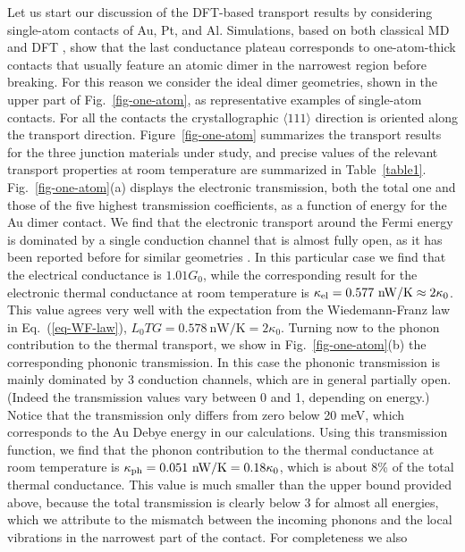 \documentclass[aps,amsmath,amssymb,twocolumn,showpacs]{revtex4-1}
\begin{document}
Let us start our discussion of the DFT-based transport results by considering
single-atom contacts of Au, Pt, and Al. Simulations, based on both classical
MD and DFT \cite{Jelinek2003,Dreher2005,Pauly2006}, show that the last
conductance plateau corresponds to one-atom-thick contacts that usually
feature an atomic dimer in the narrowest region before breaking. For this
reason we consider the ideal dimer geometries, shown in the upper part of
Fig.~\ref{fig-one-atom}, as representative examples of single-atom
contacts. For all the contacts the crystallographic $\langle 111 \rangle$
direction is oriented along the transport direction. Figure~\ref{fig-one-atom}
summarizes the transport results for the three junction materials under
study, and precise values of the relevant transport properties at room
temperature are summarized in Table~\ref{table1}. Fig.~\ref{fig-one-atom}(a)
displays the electronic transmission, both the total one and those of the five
highest transmission coefficients, as a function of energy for the Au dimer
contact. We find that the electronic transport around the Fermi energy is
dominated by a single conduction channel that is almost fully open, as it has
been reported before for similar geometries
\cite{Scheer1998,Cuevas1998a,Rubio-Bollinger2003,Pauly2008}. In this
particular case we find that the electrical conductance is $1.01G_0$, while
the corresponding result for the electronic thermal conductance at room
temperature is $\kappa_{\rm el} = 0.577~\text{nW/K}\approx 2\kappa_0$. This
value agrees very well with the expectation from the Wiedemann-Franz law in
Eq.~(\ref{eq-WF-law}), $L_0TG = 0.578~\text{nW/K}=2\kappa_0$. Turning now to
the phonon contribution to the thermal transport, we show in
Fig.~\ref{fig-one-atom}(b) the corresponding phononic transmission. In this
case the phononic transmission is mainly dominated by 3 conduction channels,
which are in general partially open. (Indeed the transmission values vary
between 0 and 1, depending on energy.) Notice that the transmission only
differs from zero below 20 meV, which corresponds to the Au Debye energy in
our calculations. Using this transmission function, we find that the phonon
contribution to the thermal conductance at room temperature is
$\kappa_{\rm ph} = 0.051~\text{nW/K} = 0.18\kappa_0$, which
is about 8\% of the total thermal conductance.
This value is much smaller than the upper bound provided above, because the
total transmission is clearly below 3 for almost all energies, which we
attribute to the mismatch between the incoming phonons and the local
vibrations in the narrowest part of the contact. For completeness we also
\end{document}
